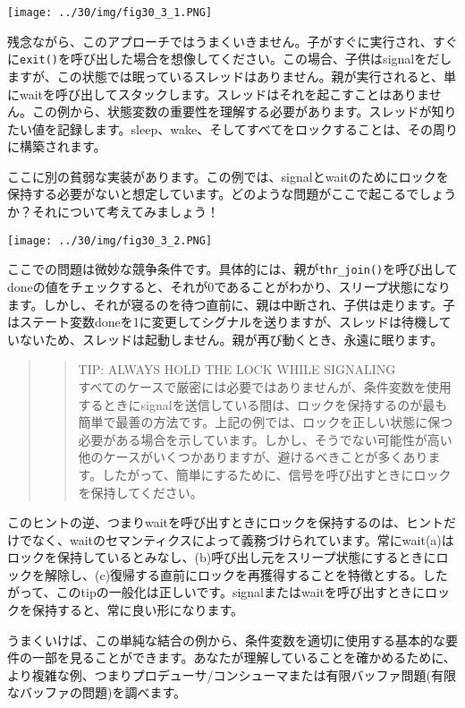 \texttt{[image: ../30/img/fig30\_3\_1.PNG]}

残念ながら、このアプローチではうまくいきません。子がすぐに実行され、すぐに\texttt{exit()}を呼び出した場合を想像してください。この場合、子供はsignalをだしますが、この状態では眠っているスレッドはありません。親が実行されると、単にwaitを呼び出してスタックします。スレッドはそれを起こすことはありません。この例から、状態変数の重要性を理解する必要があります。スレッドが知りたい値を記録します。sleep、wake、そしてすべてをロックすることは、その周りに構築されます。

ここに別の貧弱な実装があります。この例では、signalとwaitのためにロックを保持する必要がないと想定しています。どのような問題がここで起こるでしょうか？それについて考えてみましょう！

\texttt{[image: ../30/img/fig30\_3\_2.PNG]}

ここでの問題は微妙な競争条件です。具体的には、親が\texttt{thr\_join()}を呼び出してdoneの値をチェックすると、それが0であることがわかり、スリープ状態になります。しかし、それが寝るのを待つ直前に、親は中断され、子供は走ります。子はステート変数doneを1に変更してシグナルを送りますが、スレッドは待機していないため、スレッドは起動しません。親が再び動くとき、永遠に眠ります。

\begin{quote}
\begin{quote}
TIP: ALWAYS HOLD THE LOCK WHILE SIGNALING\\
すべてのケースで厳密には必要ではありませんが、条件変数を使用するときにsignalを送信している間は、ロックを保持するのが最も簡単で最善の方法です。上記の例では、ロックを正しい状態に保つ必要がある場合を示しています。しかし、そうでない可能性が高い他のケースがいくつかありますが、避けるべきことが多くあります。したがって、簡単にするために、信号を呼び出すときにロックを保持してください。
\end{quote}
\end{quote}

このヒントの逆、つまりwaitを呼び出すときにロックを保持するのは、ヒントだけでなく、waitのセマンティクスによって義務づけられています。常にwait(a)はロックを保持しているとみなし、(b)呼び出し元をスリープ状態にするときにロックを解除し、(c)復帰する直前にロックを再獲得することを特徴とする。したがって、このtipの一般化は正しいです。signalまたはwaitを呼び出すときにロックを保持すると、常に良い形になります。

うまくいけば、この単純な結合の例から、条件変数を適切に使用する基本的な要件の一部を見ることができます。あなたが理解していることを確かめるために、より複雑な例、つまりプロデューサ/コンシューマまたは有限バッファ問題(有限なバッファの問題)を調べます。

